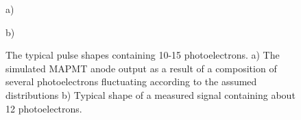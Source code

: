 \documentclass{webofc}
\begin{document}

\begin{figure}[h]
	\begin{minipage}[h]{0.45\linewidth}
		 a) \\
	\end{minipage}
	\hfill
	\begin{minipage}[h]{0.45\linewidth}
		 b) \\
	\end{minipage}
	\caption{ The typical pulse shapes containing 10-15 photoelectrons. a) The simulated MAPMT anode output as a result of a composition of several photoelectrons fluctuating according to the assumed distributions  b) Typical shape of a measured signal containing about 12 photoelectrons.}
	\label{ris:sim}
\end{figure}
\end{document}

